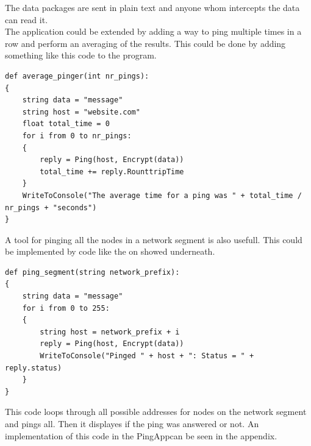 \documentclass[11pt, A4paper, english]{article}
\begin{document}
The data packages are sent in plain text and anyone whom intercepts the data can read it. \\
The application could be extended by adding a way to ping multiple times in a row and perform an averaging of the results. This could be done by adding something like this code to the program.
				\begin{lstlisting}
def average_pinger(int nr_pings):
{
	string data = "message"
	string host = "website.com"
	float total_time = 0
	for i from 0 to nr_pings:
	{
		reply = Ping(host, Encrypt(data))
		total_time += reply.RounttripTime
	}
	WriteToConsole("The average time for a ping was " + total_time / nr_pings + "seconds")
}
				\end{lstlisting}
A tool for pinging all the nodes in a network segment is also usefull. This could be implemented by code like the on showed underneath.
				\begin{lstlisting}
def ping_segment(string network_prefix):
{
	string data = "message"
	for i from 0 to 255:
	{
		string host = network_prefix + i
		reply = Ping(host, Encrypt(data))
		WriteToConsole("Pinged " + host + ": Status = " + reply.status)
	}
}
				\end{lstlisting}
This code loops through all possible addresses for nodes on the network segment and pings all. Then it displayes if the ping was answered or not. An implementation of this code in the PingAppcan be seen in the appendix.
\end{document}
